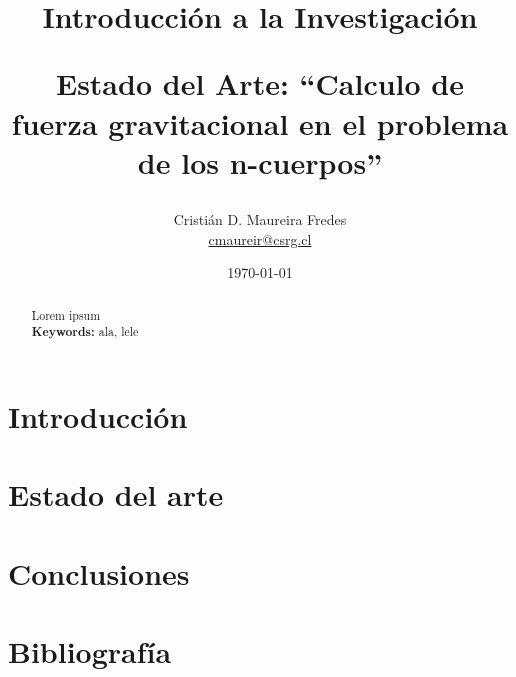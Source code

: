\documentclass[letter, 10pt]{IEEEtran}
\begin{document}

\pagestyle{empty}

\title{Introducción a la Investigación\\ \begin{Large}Estado del Arte: ``Calculo de fuerza gravitacional en el problema de los n-cuerpos''\end{Large}}
\author{Cristián D. Maureira Fredes\\\url{cmaureir@csrg.cl}}
\date{\today}

\maketitle
\begin{abstract}
Lorem ipsum\\
{\bf Keywords: } ala, lele
\end{abstract}

\section{Introducción}
\label{sec:introduccion}


\section{Estado del arte}
\label{sec:estado_arte}


\section{Conclusiones}
\label{sec:conclusiones}


\section{Bibliografía}

\end{document}
